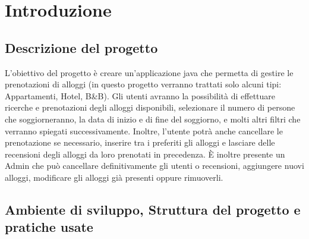 \documentclass[10pt]{article}
\begin{document}
\newpage

\tableofcontents

\newpage

\section{Introduzione}

\subsection{Descrizione del progetto}

L'obiettivo del progetto è creare un'applicazione java che permetta di gestire le prenotazioni di alloggi (in questo progetto verranno trattati solo alcuni tipi: Appartamenti, Hotel, B\&B). Gli utenti avranno la possibilità di effettuare ricerche e prenotazioni degli alloggi disponibili, selezionare il numero di persone che soggiorneranno, la data di inizio e di fine del soggiorno, e molti altri filtri che verranno spiegati successivamente. Inoltre, l'utente potrà anche cancellare le prenotazione se necessario, inserire tra i preferiti gli alloggi e lasciare delle recensioni degli alloggi da loro prenotati in precedenza. \`E inoltre presente un Admin che può cancellare definitivamente gli utenti o recensioni, aggiungere nuovi alloggi, modificare gli alloggi già presenti oppure rimuoverli.

\subsection{Ambiente di sviluppo, Struttura del progetto e pratiche usate}
\end{document}
